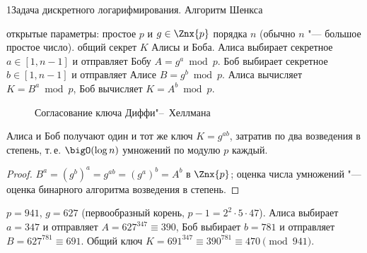 \begin{lecture}{1}{Задача дискретного логарифмирования. Алгоритм Шенкса}
\begin{algorithm}\label{l1:dh}
\begin{algorithmic}[1]
\Require открытые параметры: простое $p$ и $g \in \Znx{p}$ порядка $n$ (обычно $n$ "--- большое
простое число).
\Ensure общий секрет $K$ Алисы и Боба.
\State Алиса выбирает секретное $a \in [1, n - 1]$ и отправляет Бобу $A = g^a \bmod p$.
\State Боб выбирает секретное $b \in [1, n - 1]$ и отправляет Алисе $B = g^b \bmod p$.
\State Алиса вычисляет $K = B^a \bmod p$, Боб вычисляет $K = A^b \bmod p$.
\end{algorithmic}
\end{algorithm}

\begin{figure}[h]
\centering
{}
\caption{Согласование ключа Диффи"--~Хеллмана}
\end{figure}

\begin{proposition}
Алиса и Боб получают один и тот же ключ $K = g^{ab}$, затратив по два возведения в степень,
т.\,е. $\bigO(\log n)$ умножений по модулю $p$ каждый.
\end{proposition}

\begin{proof}
$B^a = (g^b)^a = g^{ab} = (g^a)^b = A^b$ в $\Znx{p}$; оценка числа умножений "--- оценка
бинарного алгоритма возведения в степень.
\end{proof}

\begin{example}
$p = 941$, $g = 627$ (первообразный корень, $p - 1 = 2^2 \cdot 5 \cdot 47$). Алиса выбирает
$a = 347$ и отправляет $A = 627^{347} \equiv 390$, Боб выбирает $b = 781$ и отправляет
$B = 627^{781} \equiv 691$. Общий ключ $K = 691^{347} \equiv 390^{781} \equiv 470 \pmod{941}$.
\end{example}


\end{lecture}
